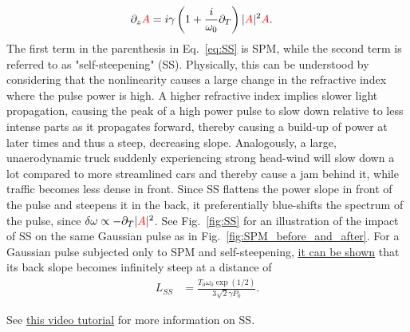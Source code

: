 \begin{align}
\label{eq:SS}
    \partial_z\textcolor{red}{A} &= i\gamma\left(1+\frac{i}{\omega_0}\partial_T \right)|\textcolor{red}{A}|^2\textcolor{red}{A}.
\end{align}
The first term in the parenthesis in Eq.~\ref{eq:SS} is SPM, while the second term is referred to as "self-steepening" (SS). Physically, this can be understood by considering that the nonlinearity causes a large change in the refractive index where the pulse power is high. A higher refractive index implies slower light propagation, causing the peak of a high power pulse to slow down relative to less intense parts as it propagates forward, thereby causing a build-up of power at later times and thus a steep, decreasing slope. Analogously, a large, unaerodynamic truck suddenly experiencing strong head-wind will slow down a lot compared to more streamlined cars and thereby cause a jam behind it, while traffic becomes less dense in front. Since SS flattens the power slope in front of the pulse and steepens it in the back, it preferentially blue-shifts the spectrum of the pulse, since $\delta\omega\propto -\partial_T|\textcolor{red}{A}|^2$. See Fig.~\ref{fig:SS} for an illustration of the impact of SS on the same Gaussian pulse as in Fig.~\ref{fig:SPM_before_and_after}. For a Gaussian pulse subjected only to SPM and self-steepening, \href{https://prefetch.eu/know/concept/self-steepening/}{it can be shown} that its back slope becomes infinitely steep at a distance of
\begin{align}
    L_{SS} &= \frac{T_0\omega_0\exp(1/2)}{3\sqrt{2}\gamma P_0}.
\end{align}


See \href{https://youtu.be/Fr6yLtGZ2To}{this video tutorial} for more information on SS. 

